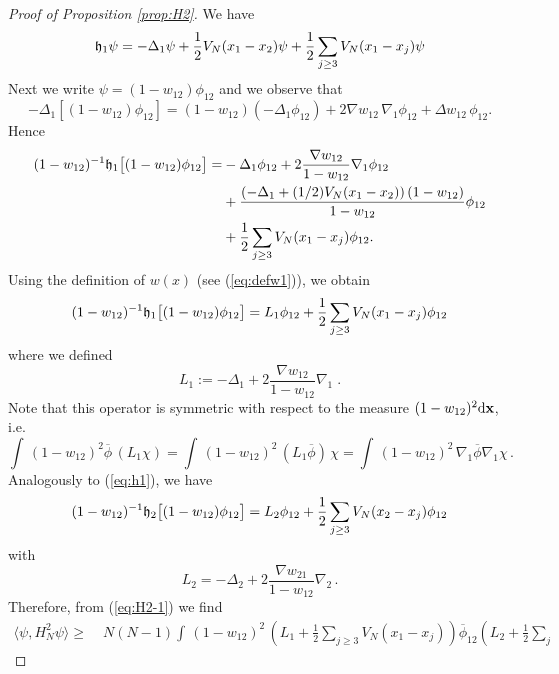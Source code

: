 \documentclass[11pt]{article}
\newcommand{\rd}{{\rm d}}
\newcommand{\bx}{{\bf x}}
\newcommand{\ov}{\overline}
\newcommand{\fh}{{\frak h}}
\begin{document}
\begin{proof}[Proof of Proposition \ref{prop:H2}]
We have
\begin{equation}
\fh_1 \psi = - \Delta_1 \psi + \frac{1}{2} V_N (x_1 -x_2) \psi +
\frac{1}{2} \sum_{j \geq 3} V_N (x_1 -x_j) \psi
\end{equation}
Next we write $\psi = (1- w_{12}) \phi_{12}$ and we observe that
\begin{equation}
-\Delta_1 [(1-w_{12}) \phi_{12}] = (1- w_{12}) (-\Delta_1 \phi_{12}) +
2 \nabla w_{12} \, \nabla_1 \phi_{12}  + \Delta w_{12} \, \phi_{12}.
\end{equation}
Hence
\begin{equation}
\begin{split}
(1-w_{12})^{-1} \fh_1\big[ (1-w_{12}) \phi_{12}\big] = &-\Delta_1 \phi_{12} +
2 \frac{\nabla w_{12}}{1-w_{12}} \nabla_1 \phi_{12} \\ &+
\frac{\left(-\Delta_1 +(1/2) V_N (x_1 -x_2) \right)
(1-w_{12})}{1-w_{12}} \phi_{12} \\ &+ \frac{1}{2} \sum_{j \geq 3}
V_{N} (x_1 -x_j) \phi_{12}.
\end{split}
\end{equation}
Using the definition of $w (x)$ (see (\ref{eq:defw1})), we obtain
\begin{equation}\label{eq:h1}
(1-w_{12})^{-1} \fh_1 \big[ (1-w_{12}) \phi_{12}\big] = L_1 \phi_{12} +
\frac{1}{2} \sum_{j \geq 3} V_{N} (x_1 - x_j) \phi_{12}
\end{equation}
where we defined  \[ L_1 := -\Delta_1 + 2 \frac{\nabla
w_{12}}{1-w_{12}} \nabla_1 \; .
\]
Note that this operator is symmetric with respect to the measure
$(1-w_{12})^2 \rd \bx$, i.e.
\begin{equation}
\int \, (1- w_{12})^2 \ov{\phi} \, ( L_1 \chi) = \int  \, (1- w_{12})^2
\, (L_1 \ov{\phi}) \, \chi = \int  \, (1- w_{12})^2 \, \nabla_1\ov{\phi}
\nabla_1 \chi \, .
\end{equation}
Analogously to (\ref{eq:h1}), we have
\begin{equation}
(1-w_{12})^{-1} \fh_2 \big[ (1-w_{12}) \phi_{12} \big]= L_2 \phi_{12} +
\frac{1}{2} \sum_{j \geq 3} V_N (x_2 - x_j) \phi_{12}
\end{equation}
with
\[ L_2= -\Delta_2 + 2 \frac{\nabla w_{21}}{1-w_{12}} \nabla_2 \, .\]
Therefore, from (\ref{eq:H2-1}) we find
\begin{equation}\label{eq:H2-2}
\begin{split}
\langle \psi, H_N^2 \psi \rangle \geq \; &N (N-1) \int \,
(1-w_{12})^2 \, \left( L_1 + \frac{1}{2} \sum_{j \geq 3} V_N (x_1 -
x_j) \right) \overline{\phi}_{12} \left( L_2 + \frac{1}{2} \sum_{j
}
\end{split}
\end{equation}
\end{proof}
\end{document}
